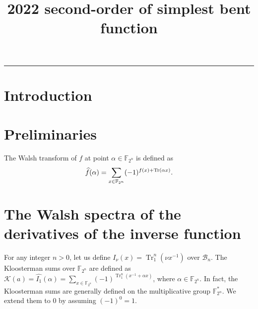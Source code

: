 \documentclass{article}
\title{ 2022 second-order of simplest \mathcal{PS} bent function}
\newcommand{\F}{\mathbb{F}}
\newcommand{\0}{\textbf{0}}
\newcommand{\1}{\textbf{1}}
\newcommand{\B}{\mathcal{B}}
\newcommand{\TrN}{\operatorname{Tr}_1^n}
\theoremstyle{plain}
\newtheorem{lemma}{Lemma}
\theoremstyle{nonumberplain}
\begin{document}
  \noindent
  \rule{\linewidth}{0.4pt}


\section{Introduction}

\section{Preliminaries}
The Walsh transform of $f$ at point $\alpha \in \F_{2^n}$ is defined as
\begin{equation*}
    \widehat{f}(\alpha)=\sum_{x \in \F_{2^n}}(-1)^{f(x)+\Tr(\alpha x)}.
\end{equation*}




\section{The Walsh spectra of the derivatives of the inverse function}

For any integer $n>0$, let us define $I_\nu(x)=\TrN(\nu x^{-1})$ over $\B_n$.
The Kloosterman sums over $\F_{2^n}$ are defined as
$\mathcal{K}(a)=\widehat{I_1}(\alpha)=\sum_{x\in\F_{2^n}}(-1)^{\TrN(x^{-1}+\alpha x)}$, where $\alpha\in\F_{2^n}$.
In fact, the Kloosterman sums are generally defined on the multiplicative
group $\F_{2^n}^*$. We extend them to $0$ by assuming $(-1)^0=1$.
\end{document}
